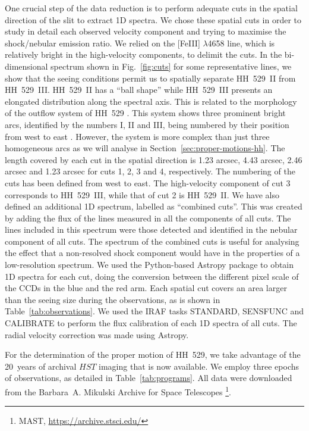 \documentclass[fleqn,usenatbib]{mnras}
\begin{document}
One crucial step of the data reduction is to perform adequate cuts in the spatial direction of the slit to extract 1D spectra. We chose these spatial cuts in order to study in detail each observed velocity component and trying to maximise the shock/nebular emission ratio. We relied on the [Fe\thinspace III] $\lambda$4658 line, which is relatively bright in the high-velocity components, to delimit the cuts. In the bi-dimensional spectrum shown in Fig.~\ref{fig:cuts} for some representative lines, we show that the seeing conditions permit us to spatially separate HH~529~II from HH~529~III. HH~529~II has a ``ball shape'' while HH~529~III presents an elongated distribution along the spectral axis. This is related to the morphology of the outflow system of HH~529 \citep[firstly identified by][]{bally00}. This system shows three prominent bright arcs, identified by the numbers I, II and III, being numbered by their position from west to east \citep{odellyhenney08}. However, the system is more complex than just three homogeneous arcs as we will analyse in Section~\ref{sec:proper-motions-hh}. The length covered by each cut in the spatial direction is 1.23 arcsec, 4.43 arcsec, 2.46 arcsec and 1.23 arcsec for cuts 1, 2, 3 and 4, respectively. The numbering of the cuts has been defined from west to east. The high-velocity component of cut 3 corresponds to HH~529~III, while that of cut 2 is HH~529~II. We have also defined an additional 1D spectrum, labelled as ``combined cuts''. This was created by adding the flux of the lines measured in all the components of all cuts. The lines included in this spectrum were those  detected and identified in the nebular component of all cuts. The spectrum of the combined cuts is useful for analysing the effect that a non-resolved shock component would have in the properties of a low-resolution spectrum.
We used the Python-based Astropy package \citep{astropy_a,astropy_b} to obtain 1D spectra for each cut, doing the conversion between the different pixel scale of the CCDs in the blue and the red arm. Each spatial cut covers an area larger than the seeing size during the observations, as is shown in Table~\ref{tab:observations}. We used the IRAF tasks STANDARD, SENSFUNC and CALIBRATE to perform the flux calibration of each 1D spectra of all cuts. The radial velocity correction was made using Astropy. 

For the determination of the proper motion of HH~529, we take advantage of the 20~years of archival $HST$ imaging that is now available. We employ three epochs of observations, as detailed in Table~\ref{tab:programs}.
All data were downloaded from the Barbara~A. Mikulski Archive for Space Telescopes%
\footnote{MAST, \url{https://archive.stsci.edu/}}. 
\end{document}
